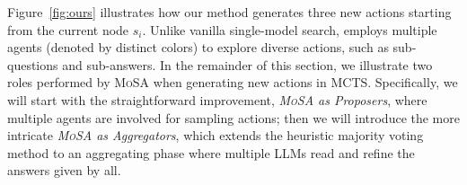 Figure~\ref{fig:ours} illustrates how our method generates three new actions starting from the current node $s_i$. 
Unlike vanilla single-model search, \mosa{} employs multiple agents (denoted by distinct colors) to explore diverse actions, such as sub-questions and sub-answers.
In the remainder of this section, we illustrate two roles performed by \textsc{MoSA} when generating new actions in MCTS.
Specifically, we will start with the straightforward improvement, \emph{\textsc{MoSA} as Proposers}, where multiple agents are involved for sampling actions;
then we will introduce the more intricate \emph{\textsc{MoSA} as Aggregators}, which extends the heuristic majority voting method to an aggregating phase where multiple LLMs read and refine the answers given by all.





